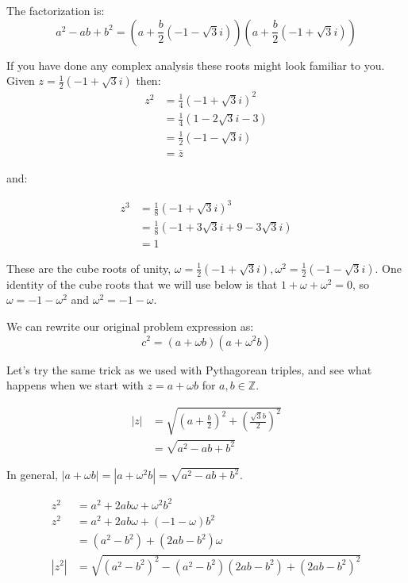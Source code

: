 \documentclass{article}
\begin{document}
The factorization is:
\[ a^2 - ab + b^2 = 
\left(a + \frac{b}{2}\left(-1 - \sqrt{3}i\right) \right)
\left(a + \frac{b}{2}\left(-1 + \sqrt{3}i\right) \right) \]

If you have done any complex analysis these roots might look familiar to you. Given 
$z = \frac{1}{2}(-1+\sqrt{3}i)$ then:
\begin{equation*}
        \begin{split} 
		z^2 & = \frac{1}{4}(-1+\sqrt{3}i)^2 \\
		& = \frac{1}{4}(1 - 2\sqrt{3}i - 3) \\
		& = \frac{1}{2}(-1 - \sqrt{3}i) \\
		& = \bar{z}
        \end{split}
\end{equation*}

and:

\begin{equation*}
        \begin{split}
                z^3 & = \frac{1}{8}(-1+\sqrt{3}i)^3 \\
		& = \frac{1}{8}(- 1 + 3\sqrt{3}i +9 -3\sqrt{3}i) \\
                & = 1
        \end{split}
\end{equation*}

These are the cube roots of unity, $\omega = \frac{1}{2}(-1+\sqrt{3}i), \omega^2 = \frac{1}{2}(-1-\sqrt{3}i)$.
One identity of the cube roots that we will use below is that $1 + \omega + \omega^2 = 0$, so 
$\omega = -1 -\omega^2$ and $\omega^2 = -1 -\omega$.

We can rewrite our original problem expression as:
\[ c^2 = (a+\omega b)(a + \omega^2 b) \]

Let's try the same trick as we used with Pythagorean triples, and see what happens when we start with
$z = a + \omega b$ for $a,b\in \mathbb{Z}$.

\begin{equation*}
        \begin{split}
		|z| & = \sqrt{(a+\frac{b}{2})^2 + (\frac{\sqrt{3}b}{2})^2} \\ 
		    &= \sqrt{a^2-ab+b^2} 
	\end{split}
\end{equation*}

In general, $|a+ \omega b| = |a + \omega^2 b| = \sqrt{a^2-ab+b^2}$.

\begin{equation*}
        \begin{split}
                z^2 & = a^2 + 2ab\omega +\omega^2 b^2 \\
		z^2 & = a^2 + 2ab\omega +(-1 - \omega) b^2 \\
		    & = (a^2 -b^2) + (2ab - b^2)\omega \\
		|z^2| &= \sqrt{(a^2-b^2)^2 - (a^2-b^2)(2ab-b^2) + (2ab-b^2)^2}
	\end{split}
\end{equation*}
\end{document}
